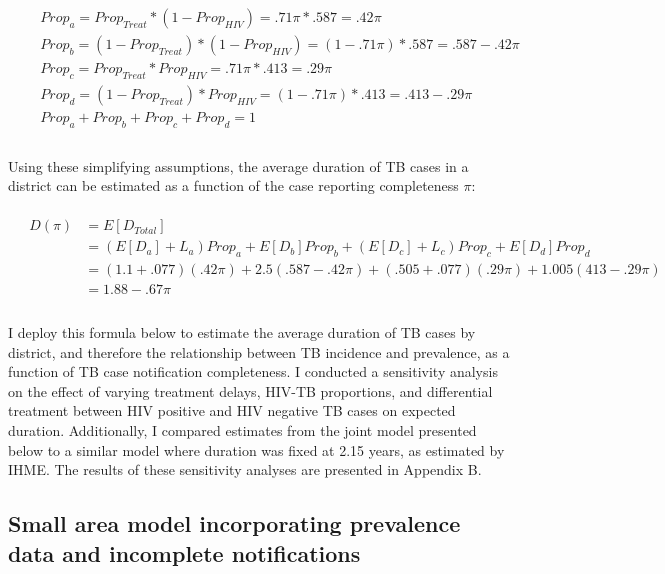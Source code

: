 \documentclass[
]{report}
\begin{document}
\begin{math}\begin{aligned}
\\
\;\;\;\;&Prop_a = Prop_{Treat} * (1-Prop_{HIV}) = .71\pi * .587 = .42\pi \\
&Prop_b = (1-Prop_{Treat}) * (1-Prop_{HIV}) = (1-.71\pi) * .587 = .587 - .42\pi \\
&Prop_c = Prop_{Treat} * Prop_{HIV} = .71\pi * .413 = .29\pi \\
&Prop_d = (1-Prop_{Treat})*Prop_{HIV} = (1-.71\pi)*.413 = .413 - .29\pi\\
&Prop_a + Prop_b + Prop_c + Prop_d = 1 \\
\\
\end{aligned}\end{math}

Using these simplifying assumptions, the average duration of TB cases in a district can be estimated as a function of the case reporting completeness \(\pi\):

\begin{math}\begin{aligned}
\\
\;\;\;\;D(\pi) &= E[D_{Total}] \\
  &= (E[D_a] + L_a) Prop_a + E[D_b]Prop_b + (E[D_c] + L_c)Prop_c + E[D_d]Prop_d \\
  &= (1.1 + .077)(.42\pi) + 2.5(.587-.42\pi)+(.505+.077)(.29\pi)+1.005(413-.29\pi) \\
  &= 1.88 - .67\pi \\
\\
\end{aligned}\end{math}

I deploy this formula below to estimate the average duration of TB cases by district, and therefore the relationship between TB incidence and prevalence, as a function of TB case notification completeness. I conducted a sensitivity analysis on the effect of varying treatment delays, HIV-TB proportions, and differential treatment between HIV positive and HIV negative TB cases on expected duration. Additionally, I compared estimates from the joint model presented below to a similar model where duration was fixed at 2.15 years, as estimated by IHME. The results of these sensitivity analyses are presented in Appendix B.

\hypertarget{small-area-model-incorporating-prevalence-data-and-incomplete-notifications}{%
\subsection{Small area model incorporating prevalence data and incomplete notifications}\label{small-area-model-incorporating-prevalence-data-and-incomplete-notifications}}
\end{document}
